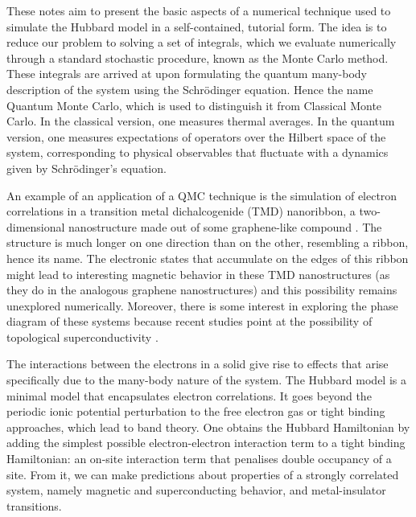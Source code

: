
\label{cap:afqmc}

\slshape

These notes aim to present the basic aspects of a numerical technique used to simulate the Hubbard model in a self-contained, tutorial form. The idea is to reduce our problem to solving a set of integrals, which we evaluate numerically through a standard stochastic procedure, known as the Monte Carlo method. These integrals are arrived at upon formulating the quantum many-body description of the system using the Schr\"odinger equation. Hence the name Quantum Monte Carlo, which is used to distinguish it from Classical Monte Carlo. In the classical version, one measures thermal averages. In the quantum version, one measures expectations of operators over the Hilbert space of the system, corresponding to physical observables that fluctuate with a dynamics given by Schr\"odinger's equation.

An example of an application of a QMC technique is the simulation of electron correlations in a transition metal dichalcogenide (TMD) nanoribbon, a two-dimensional nanostructure made out of some graphene-like compound \cite{yang_strain-tuning_2017, raczkowski_interplay_2017, chen_fabrication_2017, wang_electronics_2012, braz_valley_2017}. The structure is much longer on one direction than on the other, resembling a ribbon, hence its name. The electronic states that accumulate on the edges of this ribbon might lead to interesting magnetic behavior in these TMD nanostructures (as they do in the analogous graphene nanostructures\cite{yazyev_emergence_2010}) and this possibility remains unexplored numerically\cite{feldner_dynamical_2011, golor_quantum_2013}. Moreover, there is some interest in exploring the phase diagram of these systems because recent studies point at the possibility of topological superconductivity \cite{hsu_topological_2017}.

The interactions between the electrons in a solid give rise to effects that arise specifically due to the many-body nature of the system. The Hubbard model is a minimal model that encapsulates electron correlations. It goes beyond the periodic ionic potential perturbation to the free electron gas or tight binding approaches, which lead to band theory. One obtains the Hubbard Hamiltonian by adding the simplest possible electron-electron interaction term to a tight binding Hamiltonian: an on-site interaction term that penalises double occupancy of a site. From it, we can make predictions about properties of a strongly correlated system, namely magnetic and superconducting behavior, and metal-insulator transitions.

